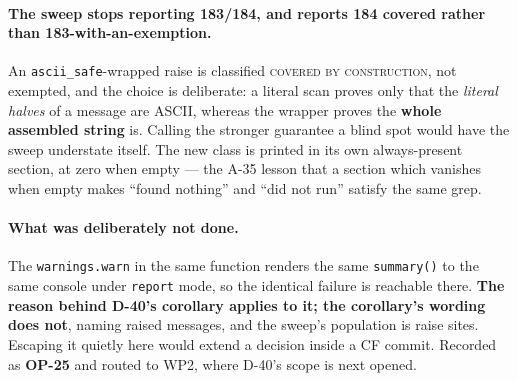 \documentclass[
  10pt,
]{article}
\begin{document}
\paragraph{The sweep stops reporting 183/184, and reports 184 covered rather than 183-with-an-exemption.}
An \texttt{ascii\_safe}-wrapped raise is classified \textsc{covered by construction}, not exempted, and the choice is deliberate: a literal scan proves only that the \emph{literal halves} of a message are ASCII, whereas the wrapper proves the \textbf{whole assembled string} is. Calling the stronger guarantee a blind spot would have the sweep understate itself. The new class is printed in its own always-present section, at zero when empty --- the A-35 lesson that a section which vanishes when empty makes ``found nothing'' and ``did not run'' satisfy the same grep.

\paragraph{What was deliberately not done.}
The \texttt{warnings.warn} in the same function renders the same \texttt{summary()} to the same console under \texttt{report} mode, so the identical failure is reachable there. \textbf{The reason behind D-40's corollary applies to it; the corollary's wording does not}, naming raised messages, and the sweep's population is raise sites. Escaping it quietly here would extend a decision inside a CF commit. Recorded as \textbf{OP-25} and routed to WP2, where D-40's scope is next opened.
\end{document}
